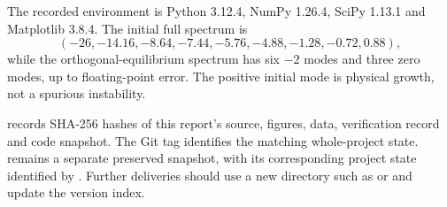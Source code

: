 The recorded environment is Python 3.12.4, NumPy 1.26.4,
SciPy 1.13.1 and Matplotlib 3.8.4. The initial full spectrum is
\[
(-26,-14.16,-8.64,-7.44,-5.76,-4.88,-1.28,-0.72,0.88),
\]
while the orthogonal-equilibrium spectrum has six $-2$ modes and
three zero modes, up to floating-point error. The positive initial
mode is physical growth, not a spurious instability.

 records SHA-256 hashes of this report's
source, figures, data, verification record and code snapshot.
The Git tag  identifies the matching whole-project
state.  remains a separate preserved snapshot,
with its corresponding project state identified by .
Further deliveries should use a new directory such as
 or  and update the version index.
